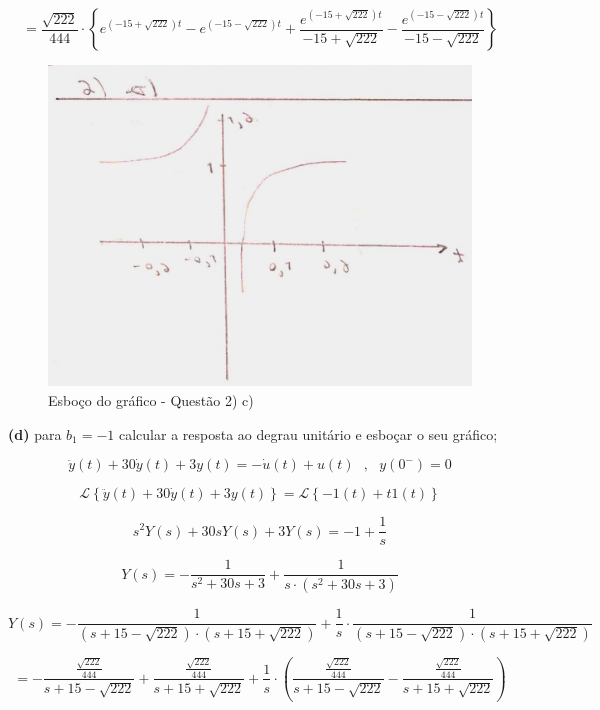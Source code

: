 \documentclass{article}
\begin{document}
\[ = \frac{\sqrt{222}}{444} \cdot \left\{ e^{(-15+\sqrt{222})t} - e^{(-15-\sqrt{222})t} + \frac{e^{(-15+\sqrt{222})t}}{-15+\sqrt{222}} - \frac{e^{(-15-\sqrt{222})t}}{-15-\sqrt{222}} \right\} \]

\begin{figure}[h]
    \includegraphics[scale=0.21]{Q2_c.png}
    \centering
    \caption{Esboço do gráfico - Questão 2) c)}
\end{figure}

\vspace{\baselineskip}

\textbf{(d)} para $b_1 = -1$ calcular a resposta ao degrau unitário e esboçar o seu gráfico;

\vspace{\baselineskip}

\[\ddot{y}(t) + 30\dot{y}(t) + 3y(t) = - \dot{u}(t) + u(t)\,\,\,\,,\,\,\,\,y(0^{-}) = 0\]

\[\mathcal{L} \left\{\ddot{y}(t) + 30\dot{y}(t) + 3y(t)\right\} = \mathcal{L} \left\{- 1(t) + t1(t)\right\}\]

\[ s^{2}Y(s) + 30sY(s) + 3Y(s) = - 1 + \frac{1}{s} \]

\[ Y(s) = - \frac{1}{s^{2} + 30s + 3} + \frac{1}{s \cdot (s^{2} + 30s + 3)}\]

\[ Y(s) = - \frac{1}{(s + 15 - \sqrt{222}) \cdot (s + 15 + \sqrt{222})} + \frac{1}{s} \cdot \frac{1}{(s + 15 - \sqrt{222}) \cdot (s + 15 + \sqrt{222})}\]

\[  = - \frac{ \frac{\sqrt{222}}{444}}{s + 15 - \sqrt{222}} + \frac{\frac{\sqrt{222}}{444}}{s + 15 + \sqrt{222}} + \frac{1}{s} \cdot \left(\frac{ \frac{\sqrt{222}}{444}}{s + 15 - \sqrt{222}} - \frac{\frac{\sqrt{222}}{444}}{s + 15 + \sqrt{222}}\right) \]
\end{document}
